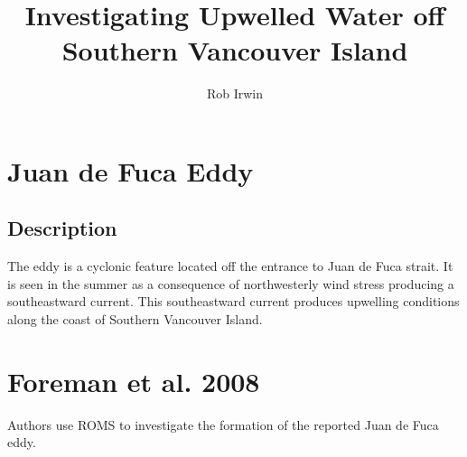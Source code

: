 \documentclass{report}
\title{Investigating Upwelled Water off Southern Vancouver Island}
\author{Rob Irwin}
\begin{document}
\maketitle

\section{Juan de Fuca Eddy}

\subsection{Description}

The eddy is a cyclonic feature located off the entrance to Juan de Fuca strait. It is seen in the summer as a consequence of northwesterly wind stress producing a southeastward current. This southeastward current produces upwelling conditions along the coast of Southern Vancouver Island.

\section{Foreman et al. 2008}

Authors use ROMS to investigate the formation of the reported Juan de Fuca eddy.
\end{document}

